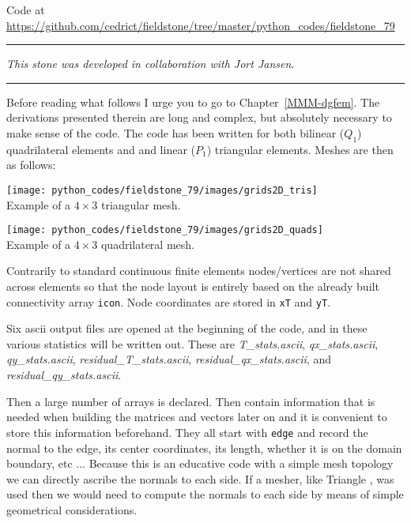 

\begin{center}
Code at \url{https://github.com/cedrict/fieldstone/tree/master/python_codes/fieldstone_79}
\end{center}

\par\noindent\rule{\textwidth}{0.4pt}

{\sl This stone was developed in collaboration with Jort Jansen}. 

\par\noindent\rule{\textwidth}{0.4pt}


Before reading what follows I urge you to go to Chapter~\ref{MMM-dgfem}. The derivations 
presented therein are long and complex, but absolutely necessary to make sense of the code.  
The code has been written for both bilinear ($Q_1$) quadrilateral elements and 
and linear ($P_1$) triangular elements. Meshes are then as follows:

\begin{center}
\texttt{[image: python\_codes/fieldstone\_79/images/grids2D\_tris]}\\
{\captionfont Example of a $4\times 3$ triangular mesh.}
\end{center}

\begin{center}
\texttt{[image: python\_codes/fieldstone\_79/images/grids2D\_quads]}\\
{\captionfont Example of a $4\times 3$ quadrilateral mesh.}
\end{center}

Contrarily to standard continuous finite elements nodes/vertices are not 
shared across elements so that the node layout is entirely based on the 
already built connectivity array {\tt icon}. Node coordinates are stored in 
{\tt xT} and {\tt yT}.

Six ascii output files are opened at the beginning of the code, and in these 
various statistics will be written out. These are 
{\sl T\_stats.ascii}, {\sl qx\_stats.ascii}, {\sl qy\_stats.ascii},
{\sl residual\_T\_stats.ascii}, {\sl residual\_qx\_stats.ascii}, and {\sl residual\_qy\_stats.ascii}.

Then a large number of arrays is declared. Then contain information that is needed 
when building the matrices and vectors later on and it is convenient to store this information
beforehand. They all start with {\tt edge} and record the normal to the edge, its center coordinates, 
its length, whether it is on the domain boundary, etc ... Because this is an educative code 
with a simple mesh topology we can directly ascribe the normals to each side. If a mesher, like 
Triangle \cite{shew14}, was used then we would need to compute the normals to each side by means
of simple geometrical considerations.

